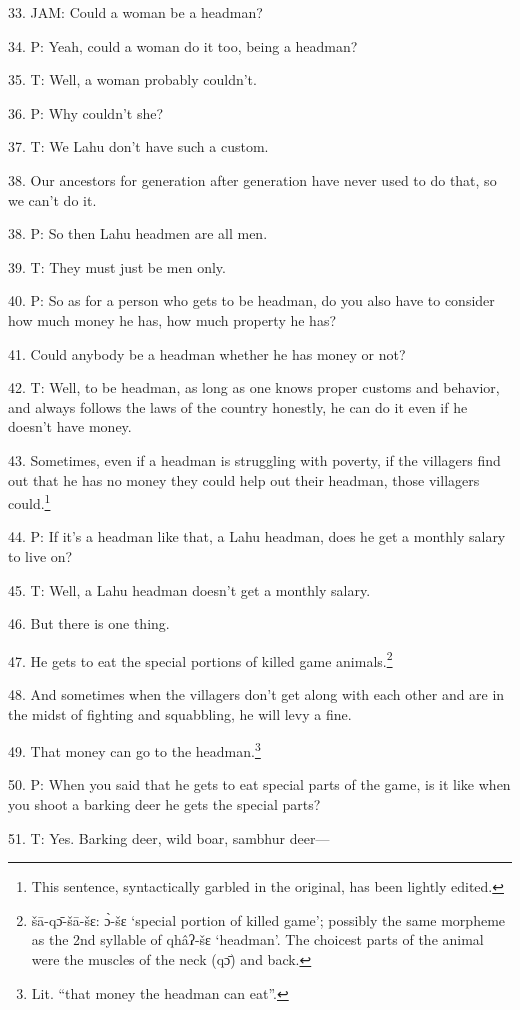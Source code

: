 33. JAM: Could a woman be a headman?

34. P: Yeah, could a woman do it too, being a headman?

35. T: Well, a woman probably couldn't.

36. P: Why couldn't she?

37. T: We Lahu don't have such a custom.

38. Our ancestors for generation after generation have never used to do that, so
we can't do it.

38. P: So then Lahu headmen are all men.

39. T: They must just be men only.

40. P: So as for a person who gets to be headman, do you also have to consider
how much money he has, how much property he has?

41. Could anybody be a headman whether he has money or not?

42. T: Well, to be headman, as long as one knows proper customs and behavior, and
always follows the laws of the country honestly, he can do it even if he doesn't
have money.

43. Sometimes, even if a headman is struggling with poverty, if the villagers find
out that he has no money they could help out their headman, those villagers could.\footnote{This sentence, syntactically garbled in the original, has been lightly edited.}

44. P: If it's a headman like that, a Lahu headman, does he get a monthly salary
to live on?

45. T: Well, a Lahu headman doesn't get a monthly salary.

46. But there is one thing.

47. He gets to eat the special portions of killed game animals.\footnote{šā-qɔ̄-šā-šɛ: ɔ̀-šɛ `special portion of killed game'; possibly the same morpheme as the 2nd syllable of qhâʔ-šɛ `headman'. The choicest parts of the animal were the muscles of the neck (qɔ̄) and back.}

48. And sometimes when the villagers don't get along with each other and are in
the midst of fighting and squabbling, he will levy a fine.

49. That money can go to the headman.\footnote{Lit. ``that money the headman can eat''.}

50. P: When you said that he gets to eat special parts of the game, is it like
when you shoot a barking deer he gets the special parts?

51. T: Yes. Barking deer, wild boar, sambhur deer---

